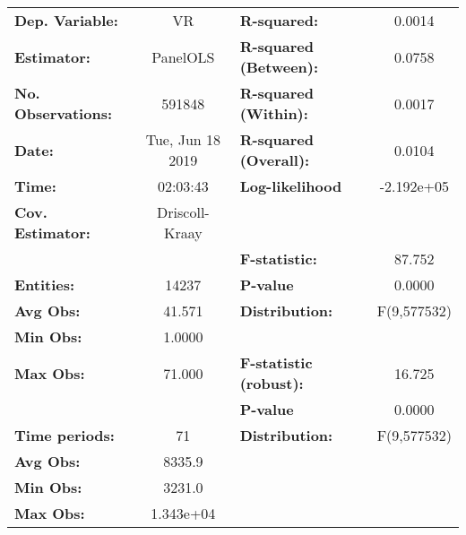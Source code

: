 \begin{center}
\begin{tabular}{lclc}
\toprule
\textbf{Dep. Variable:}                 &         VR         & \textbf{  R-squared:         }   &      0.0014      \\
\textbf{Estimator:}                     &      PanelOLS      & \textbf{  R-squared (Between):}  &      0.0758      \\
\textbf{No. Observations:}              &       591848       & \textbf{  R-squared (Within):}   &      0.0017      \\
\textbf{Date:}                          &  Tue, Jun 18 2019  & \textbf{  R-squared (Overall):}  &      0.0104      \\
\textbf{Time:}                          &      02:03:43      & \textbf{  Log-likelihood     }   &    -2.192e+05    \\
\textbf{Cov. Estimator:}                &   Driscoll-Kraay   & \textbf{                     }   &                  \\
\textbf{}                               &                    & \textbf{  F-statistic:       }   &      87.752      \\
\textbf{Entities:}                      &       14237        & \textbf{  P-value            }   &      0.0000      \\
\textbf{Avg Obs:}                       &       41.571       & \textbf{  Distribution:      }   &   F(9,577532)    \\
\textbf{Min Obs:}                       &       1.0000       & \textbf{                     }   &                  \\
\textbf{Max Obs:}                       &       71.000       & \textbf{  F-statistic (robust):} &      16.725      \\
\textbf{}                               &                    & \textbf{  P-value            }   &      0.0000      \\
\textbf{Time periods:}                  &         71         & \textbf{  Distribution:      }   &   F(9,577532)    \\
\textbf{Avg Obs:}                       &       8335.9       & \textbf{                     }   &                  \\
\textbf{Min Obs:}                       &       3231.0       & \textbf{                     }   &                  \\
\textbf{Max Obs:}                       &     1.343e+04      & \textbf{                     }   &                  \\

\end{tabular}
\end{center}
